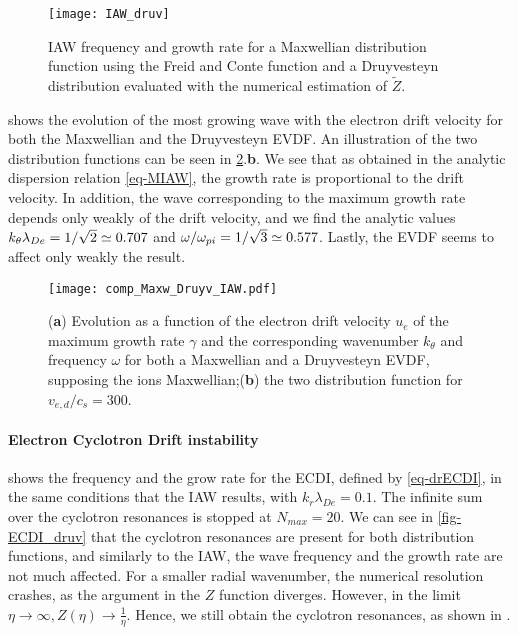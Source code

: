   \begin{figure}[!hbt]
    \centering
    \texttt{[image: IAW\_druv]}
    \caption{IAW frequency and growth rate for a Maxwellian distribution function using the Freid and Conte function and a Druyvesteyn distribution evaluated with the numerical estimation of $\tilde{Z}$. }
    \label{fig-IAW_druv}
  \end{figure}
   shows the evolution of the most growing wave with the electron drift velocity for both the Maxwellian and the Druyvesteyn \ac{EVDF}.
  An illustration of the two distribution functions can be seen in \cref{fig-valition-solver}.{\bf b}.
  We see that as obtained in the analytic dispersion relation \cref{eq-MIAW}, the growth rate is proportional to the drift velocity.
  In addition, the wave corresponding to the maximum growth rate depends only weakly of the drift velocity, and we find the analytic values $k_{\theta} \lambda_{De} =1/\sqrt{2} \simeq 0.707$ and $\omega / \omega_{pi} = 1/\sqrt{3} \simeq 0.577$. 
  Lastly, the \ac{EVDF} seems to affect only weakly the result.
  
  \begin{figure}[!hbt]
    \centering
    \texttt{[image: comp\_Maxw\_Druyv\_IAW.pdf]}
    \caption{({\bf a}) Evolution as a function of the electron drift velocity $u_e$ of the maximum growth rate $\gamma$ and the corresponding wavenumber $k_{\theta}$ and frequency $\omega$ for both a Maxwellian and a Druyvesteyn \acs{EVDF}, supposing the ions Maxwellian;({\bf b}) the two distribution function for $v_{e, d}/c_s = 300$.}
    \label{fig-valition-solver}
  \end{figure}
  
  \FloatBarrier
  
  \paragraph{Electron Cyclotron Drift instability\\}
    

  
   shows the frequency and the grow rate for the \ac{ECDI}, defined by \cref{eq-drECDI}, in the same conditions that the \ac{IAW} results, with $k_r \lambda_{De} = 0.1 $.
  The infinite sum over the cyclotron resonances is stopped at $N_{max} = 20$.
  We can see in \cref{fig-ECDI_druv} that the cyclotron resonances are present for both distribution functions, and similarly to the \ac{IAW}, the wave frequency and the growth rate are not much affected.
  For a smaller radial wavenumber, the numerical resolution crashes, as the argument in the $Z$ function diverges.
  However, in the limit $\eta \rightarrow \infty, Z(\eta) \rightarrow  \frac{1}{\eta}$.
  Hence, we still obtain the cyclotron resonances, as shown in \citet[Fig. 2]{janhunen2018}.
  
